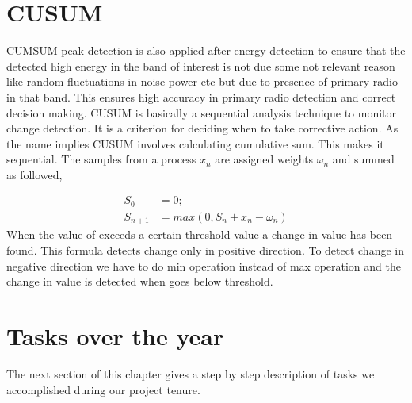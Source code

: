 \section{CUSUM}
CUMSUM peak detection is also applied after energy detection to ensure that the
detected high energy in the band of interest is not due some  not relevant 
reason like random fluctuations in noise power etc but due to presence of 
primary radio in that band. This ensures high accuracy in primary radio 
detection and correct decision making.
CUSUM is basically a sequential analysis technique to monitor change detection. 
It is a criterion for deciding when to take corrective action. As the name 
implies CUSUM involves calculating cumulative sum. This makes it sequential. 
The samples from a process $x_n$  are assigned weights $\omega_n$  and summed as followed,

\begin{align}
S_0 &= 0; \nonumber \\
S_{n+1} &= max(0, S_n + x_n - \omega_n) \nonumber
\end{align}
When the value of  exceeds a certain threshold value a change  in value has 
been found. This formula detects change only in positive direction. To detect 
change in negative direction we have to do min operation instead of max 
operation and the change in value is detected when goes below threshold.







\section{Tasks over the year}
The next section of this chapter gives a step by step description of tasks we 
accomplished during our project tenure. 


